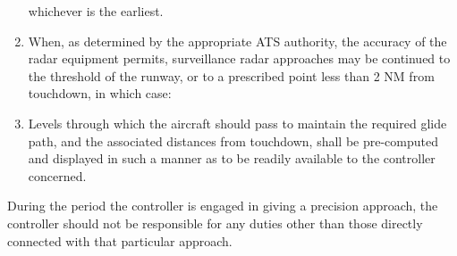\begin{enumeratesc}
\begin{enumerate}
\begin{enumalph}

            \noindent whichever is the earliest.
        \end{enumalph}

        \item \label{8.9.7.1.4} When, as determined by the appropriate ATS authority, the accuracy of the radar equipment permits, surveillance radar approaches may be continued to the threshold of the runway, or to a prescribed point less than 2 NM from touchdown, in which case:

        \item Levels through which the aircraft should pass to maintain the required glide path, and the associated distances from touchdown, shall be pre-computed and displayed in such a manner as to be readily available to the controller concerned.
    \end{enumerate}

    \begin{enumerate}[labelindent=0pt,itemsep=0.2cm]
        \par\noindent During the period the controller is engaged in giving a precision approach, the controller should not be responsible for any duties other than those directly connected with that particular approach.


\end{enumerate}
\end{enumeratesc}
